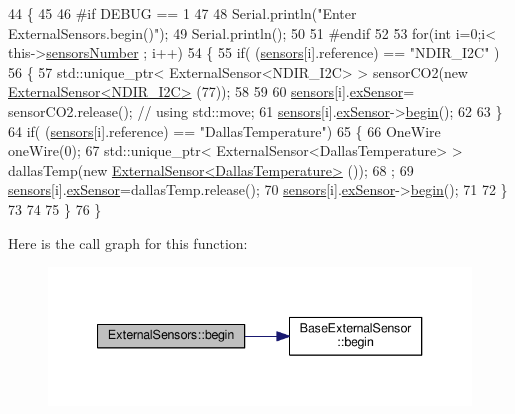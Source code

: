 \begin{DoxyCode}
44 \{
45 
46 \textcolor{preprocessor}{#if DEBUG == 1}
47 
48     Serial.println(\textcolor{stringliteral}{"Enter ExternalSensors.begin()"});
49     Serial.println();
50 
51 \textcolor{preprocessor}{#endif }
52 
53     \textcolor{keywordflow}{for}(\textcolor{keywordtype}{int} i=0;i< this->\hyperlink{classExternalSensors_a58e4fbf9adeae787d92be5fa33043b5d}{sensorsNumber} ; i++)
54     \{
55         \textcolor{keywordflow}{if}( (\hyperlink{classExternalSensors_a284233f884fcf00154a44740cf1d9e1e}{sensors}[i].reference) == \textcolor{stringliteral}{"NDIR\_I2C"} )
56         \{   
57             std::unique\_ptr< ExternalSensor<NDIR\_I2C> > sensorCO2(\textcolor{keyword}{new} 
      \hyperlink{classExternalSensor_3_01NDIR__I2C_01_4}{ExternalSensor<NDIR\_I2C>} (77));
58 
59 
60             \hyperlink{classExternalSensors_a284233f884fcf00154a44740cf1d9e1e}{sensors}[i].\hyperlink{structExternalSensors_1_1sensor_a9bca150fd468b8d0e090e6d72c5c2b48}{exSensor}= sensorCO2.release();                       \textcolor{comment}{// using
       std::move;}
61             \hyperlink{classExternalSensors_a284233f884fcf00154a44740cf1d9e1e}{sensors}[i].\hyperlink{structExternalSensors_1_1sensor_a9bca150fd468b8d0e090e6d72c5c2b48}{exSensor}->\hyperlink{classBaseExternalSensor_a87d132803d4f4fdd4e66332809f0c9a0}{begin}();
62 
63         \}
64         \textcolor{keywordflow}{if}( (\hyperlink{classExternalSensors_a284233f884fcf00154a44740cf1d9e1e}{sensors}[i].reference) == \textcolor{stringliteral}{"DallasTemperature"})
65         \{
66             OneWire oneWire(0);
67             std::unique\_ptr< ExternalSensor<DallasTemperature> > dallasTemp(\textcolor{keyword}{new} 
      \hyperlink{classExternalSensor_3_01DallasTemperature_01_4}{ExternalSensor<DallasTemperature>} ());
68              ;
69             \hyperlink{classExternalSensors_a284233f884fcf00154a44740cf1d9e1e}{sensors}[i].\hyperlink{structExternalSensors_1_1sensor_a9bca150fd468b8d0e090e6d72c5c2b48}{exSensor}=dallasTemp.release();
70             \hyperlink{classExternalSensors_a284233f884fcf00154a44740cf1d9e1e}{sensors}[i].\hyperlink{structExternalSensors_1_1sensor_a9bca150fd468b8d0e090e6d72c5c2b48}{exSensor}->\hyperlink{classBaseExternalSensor_a87d132803d4f4fdd4e66332809f0c9a0}{begin}();
71             
72         \}
73         
74         
75     \}
76 \}
\end{DoxyCode}
Here is the call graph for this function\+:\nopagebreak
\begin{figure}[H]
\begin{center}
\leavevmode
\includegraphics[width=340pt]{classExternalSensors_a58ede0d786a86417254708870f04a21e_cgraph}
\end{center}
\end{figure}
